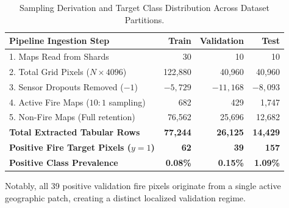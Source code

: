 \documentclass[10pt,journal,compsoc]{IEEEtran}
\begin{document}
\begin{table}[H]
\centering
\caption{Sampling Derivation and Target Class Distribution Across Dataset Partitions.}
\label{tab:split_rows}
\begin{tabular}{lrrr}
\toprule
\textbf{Pipeline Ingestion Step} & \textbf{Train} & \textbf{Validation} & \textbf{Test} \\
\midrule
1. Maps Read from Shards & 30 & 10 & 10 \\
2. Total Grid Pixels ($N \times 4096$) & 122,880 & 40,960 & 40,960 \\
3. Sensor Dropouts Removed ($-1$) & $-5,729$ & $-11,168$ & $-8,093$ \\
4. Active Fire Maps ($10:1$ sampling) & 682 & 429 & 1,747 \\
5. Non-Fire Maps (Full retention) & 76,562 & 25,696 & 12,682 \\
\midrule
\textbf{Total Extracted Tabular Rows} & \textbf{77,244} & \textbf{26,125} & \textbf{14,429} \\
\textbf{Positive Fire Target Pixels ($y=1$)} & \textbf{62} & \textbf{39} & \textbf{157} \\
\textbf{Positive Class Prevalence} & \textbf{0.08\%} & \textbf{0.15\%} & \textbf{1.09\%} \\
\bottomrule
\end{tabular}
\end{table}

Notably, all 39 positive validation fire pixels originate from a single active geographic patch, creating a distinct localized validation regime.
\end{document}
